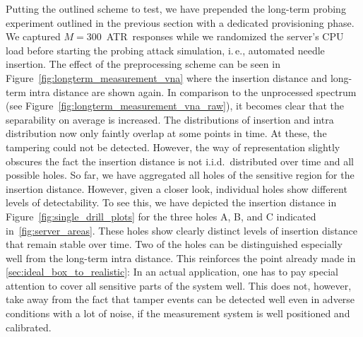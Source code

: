 \documentclass[conference]{IEEEtran}
\makeatletter
\newcommand{\ie}{i.\@\,e.\@\xspace}
\makeatother
\begin{document}
Putting the outlined scheme to test, we have prepended the long-term probing experiment outlined in the previous section with a dedicated provisioning phase. We captured $M=300$~ATR~responses while we randomized the server's CPU load before starting the probing attack simulation, \ie, automated needle insertion. The effect of the preprocessing scheme can be seen in Figure~\ref{fig:longterm_measurement_vna} where the insertion distance and long-term intra distance are shown again. In comparison to the unprocessed spectrum (see Figure~\ref{fig:longterm_measurement_vna_raw}), it becomes clear that the separability on average is increased. The distributions of insertion and intra distribution now only faintly overlap at some points in time. At these, the tampering could not be detected. However, the way of representation slightly obscures the fact the insertion distance is not i.i.d.~distributed over time and all possible holes. So far, we have aggregated all holes of the sensitive region for the insertion distance. However, given a closer look, individual holes show different levels of detectability. To see this, we have depicted the insertion distance in Figure~\ref{fig:single_drill_plots} for the three holes A, B, and C indicated in~\autoref{fig:server_areas}. These holes show clearly distinct levels of insertion distance that remain stable over time. Two of the holes can be distinguished especially well from the long-term intra distance. This reinforces the point already made in \autoref{sec:ideal_box_to_realistic}: In an actual application, one has to pay special attention to cover all sensitive parts of the system well. This does not, however, take away from the fact that tamper events can be detected well even in adverse conditions with a lot of noise, if the measurement system is well positioned and calibrated.
\end{document}
